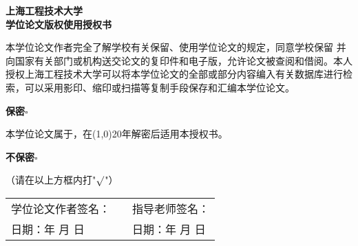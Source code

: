 \begin{center}
    \heiti\sanhao\textbf{
    上海工程技术大学 \\
    学位论文版权使用授权书}
\end{center}

本学位论文作者完全了解学校有关保留、使用学位论文的规定，同意学校保留
并向国家有关部门或机构送交论文的复印件和电子版，允许论文被查阅和借阅。本人
授权上海工程技术大学可以将本学位论文的全部或部分内容编入有关数据库进行检
索，可以采用影印、缩印或扫描等复制手段保存和汇编本学位论文。

\hspace{8em}\textbf{保密}$\square$ 

本学位论文属于\hspace{5em}，在\line(1,0){20}年解密后适用本授权书。

\hspace{8em}\textbf{不保密}$\square$ 

（请在以上方框内打\quad "\emph{$\surd$}"）

\vspace{15em}
\begin{table}[hbpt]
    \centering
    \renewcommand\arraystretch{1.8}
    \begin{tabular}{p{6cm}<{\raggedright}p{2cm}<{\centering}p{6cm}<{\raggedright}}
        学位论文作者签名：& & 指导老师签名： \\
        日期：\qquad 年 \qquad 月 \qquad 日 & & 日期：\qquad 年 \qquad 月 \qquad 日
    \end{tabular}
\end{table}
\newpage

